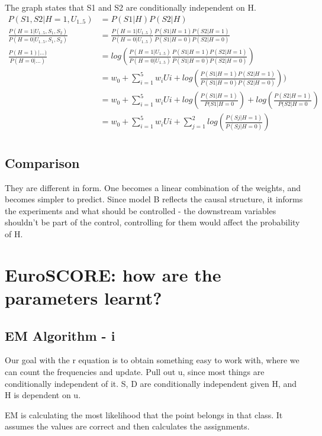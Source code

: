 \documentclass[11pt]{article}
\begin{document}
The graph states that S1 and S2 are conditionally independent on H.
\begin{align}
	P(S1,S2|H=1,U_{1..5}) &= P(S1|H)P(S2|H) \\
	\frac{P(H=1 | U_{1..5},S_1,S_2)}{P(H=0 | U_{1..5},S_1,S_2)} &=  \frac{P(H=1|U_{1..5})}{P(H=0|U_{1..5})} \frac{P(S1|H=1)P(S2|H=1)}{P(S1|H=0)P(S2|H=0)} \\
	\frac{P(H=1)|...)}{P(H=0|...)} &= log( \frac{P(H=1|U_{1..5})}{P(H=0|U_{1..5})} \frac{P(S1|H=1)P(S2|H=1)}{P(S1|H=0)P(S2|H=0)}) \\
	&=  w_0 + \sum_{i=1}^{5}w_iUi + log(\frac{P(S1|H=1)P(S2|H=1)}{P(S1|H=0)P(S2|H=0)})) \\
	&= w_0 + \sum_{i=1}^{5}w_iUi + log(\frac{P(S1|H=1)}{P(S1|H=0}) + log(\frac{P(S2|H=1)}{P(S2|H=0}) \\
	&=  w_0 + \sum_{i=1}^{5}w_iUi + \sum_{j=1}^{2} log(\frac{P(Sj|H=1)}{P(Sj|H=0)}) \\
\end{align}

\subsection{Comparison}

They are different in form. One becomes a linear combination of the weights, and becomes simpler to predict. Since model B reflects the causal structure, it informs the experiments and what should be controlled - the downstream variables shouldn't be part of the control, controlling for them would affect the probability of H.

\section{EuroSCORE: how are the parameters learnt?}

\subsection{EM Algorithm - i}

Our goal with the r equation is to obtain something easy to work with, where we can count the frequencies and update. Pull out u, since most things are conditionally independent of it. S, D are conditionally independent given H, and H is dependent on u.

EM is calculating the most likelihood that the point belongs in that class. It assumes the values are correct and then calculates the assignments.
\end{document}
